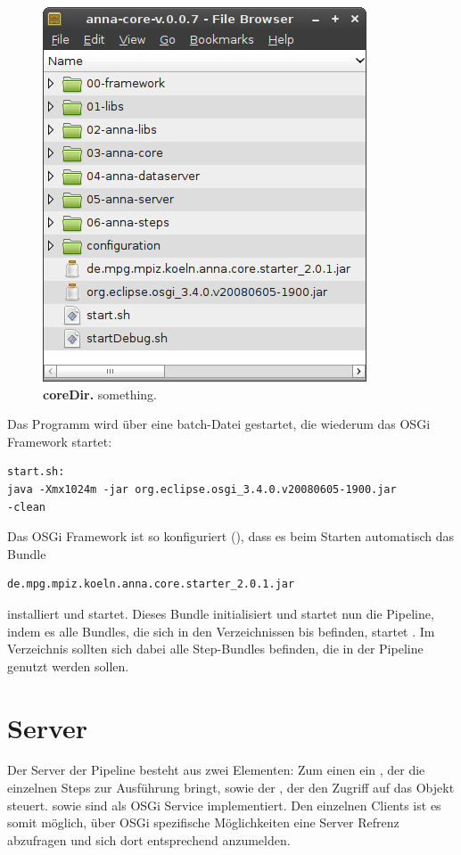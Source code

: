 \begin{figure}[htbp]
	\begin{center}
		\includegraphics[scale=0.7]{pics/coreDir.png}
	\caption[coreDir]{
	\textbf{coreDir.}
	something.}
	\end{center}
	\label{fig:programOrganisationOverview3ScaledWithAlpha}
\end{figure}

Das Programm wird über eine batch-Datei gestartet,
die wiederum das OSGi Framework startet:
\begin{verbatim}
start.sh:
java -Xmx1024m -jar org.eclipse.osgi_3.4.0.v20080605-1900.jar
-clean\end{verbatim}
Das OSGi Framework ist so konfiguriert (), dass
es beim Starten automatisch das Bundle
\begin{verbatim}
de.mpg.mpiz.koeln.anna.core.starter_2.0.1.jar
\end{verbatim}
installiert und startet.
Dieses Bundle initialisiert und startet nun die Pipeline, indem es alle Bundles,
die sich in den Verzeichnissen  bis  befinden, startet
. Im Verzeichnis  sollten sich dabei
alle Step-Bundles befinden, die in der Pipeline genutzt werden sollen.



\section{Server}
Der Server der Pipeline besteht aus zwei Elementen: Zum einen ein
, der die einzelnen Steps zur Ausführung bringt, sowie der
, der den Zugriff auf das  Objekt
 steuert.  sowie  sind
als OSGi Service implementiert. Den einzelnen Clients ist es somit möglich, über OSGi
spezifische Möglichkeiten  eine Server Refrenz abzufragen und sich
dort entsprechend anzumelden.
%

